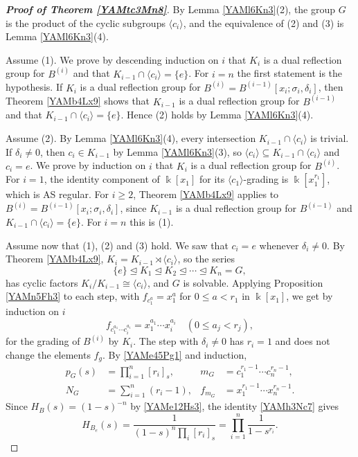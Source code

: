 \documentclass[reqno]{amsart}
\numberwithin{equation}{section}
\theoremstyle{definition}
\theoremstyle{remark}
\theoremstyle{plain}
\newcommand{\kk}{\Bbbk}
\begin{document}
\begin{proof}[\textnormal{\bfseries Proof of Theorem \ref{YAMtc3Mn8}}]
By Lemma \ref{YAMl6Kn3}(2), the group $G$ is the product of the cyclic subgroups $\langle c_i\rangle$, and the equivalence of (2) and (3) is Lemma \ref{YAMl6Kn3}(4).

Assume (1). We prove by descending induction on $i$ that $K_i$ is a dual reflection group for $B^{(i)}$ and that $K_{i-1}\cap\langle c_i\rangle=\{e\}$. For $i=n$ the first statement is the hypothesis. If $K_i$ is a dual reflection group for $B^{(i)}=B^{(i-1)}[x_i;\sigma_i,\delta_i]$, then Theorem \ref{YAMb4Lx9} shows that $K_{i-1}$ is a dual reflection group for $B^{(i-1)}$ and that $K_{i-1}\cap\langle c_i\rangle=\{e\}$. Hence (2) holds by Lemma \ref{YAMl6Kn3}(4).

Assume (2). By Lemma \ref{YAMl6Kn3}(4), every intersection $K_{i-1}\cap\langle c_i\rangle$ is trivial. If $\delta_i\neq0$, then $c_i\in K_{i-1}$ by Lemma \ref{YAMl6Kn3}(3), so $\langle c_i\rangle\subseteq K_{i-1}\cap\langle c_i\rangle$ and $c_i=e$. We prove by induction on $i$ that $K_i$ is a dual reflection group for $B^{(i)}$. For $i=1$, the identity component of $\kk[x_1]$ for its $\langle c_1\rangle$-grading is $\kk[x_1^{r_1}]$, which is AS regular. For $i\ge2$, Theorem \ref{YAMb4Lx9} applies to $B^{(i)}=B^{(i-1)}[x_i;\sigma_i,\delta_i]$, since $K_{i-1}$ is a dual reflection group for $B^{(i-1)}$ and $K_{i-1}\cap\langle c_i\rangle=\{e\}$. For $i=n$ this is (1).

Assume now that (1), (2) and (3) hold. We saw that $c_i=e$ whenever $\delta_i\neq0$. By Theorem \ref{YAMb4Lx9}, $K_i=K_{i-1}\rtimes\langle c_i\rangle$, so the series
\[
\{e\}\trianglelefteq K_1\trianglelefteq K_2\trianglelefteq\cdots\trianglelefteq K_n=G,
\]
has cyclic factors $K_i/K_{i-1}\cong\langle c_i\rangle$, and $G$ is solvable. Applying Proposition \ref{YAMn5Fh3} to each step, with $f_{c_1^{a}}=x_1^{a}$ for $0\le a<r_1$ in $\kk[x_1]$, we get by induction on $i$
\begin{equation}\label{YAMe78Nf6}
f_{c_1^{a_1}\cdots c_i^{a_i}}=x_1^{a_1}\cdots x_i^{a_i}\quad(0\le a_j<r_j),
\end{equation}
for the grading of $B^{(i)}$ by $K_i$. The step with $\delta_i\neq0$ has $r_i=1$ and does not change the elements $f_g$. By \eqref{YAMe45Pg1} and induction,
\begin{equation}\label{YAMe79Nf7}
\begin{aligned}
p_G(s)&=\prod_{i=1}^n[r_i]_s,&m_G&=c_1^{r_1-1}\cdots c_n^{r_n-1},\\
N_G&=\sum_{i=1}^n(r_i-1),&f_{m_G}&=x_1^{r_1-1}\cdots x_n^{r_n-1}.
\end{aligned}
\end{equation}
Since $H_B(s)=(1-s)^{-n}$ by \eqref{YAMe12Hs3}, the identity \eqref{YAMh3Nc7} gives
\[
H_{B_e}(s)=\frac{1}{(1-s)^n\prod_i[r_i]_s}=\prod_{i=1}^n\frac{1}{1-s^{r_i}}.
\]


\end{proof}
\end{document}
